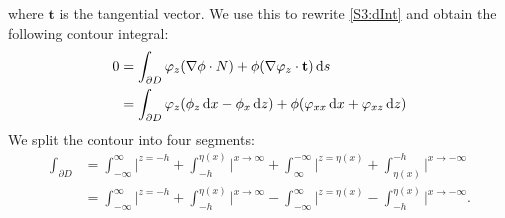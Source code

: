 \documentclass[11pt,reqno,oneside,a4paper]{article}
\begin{document}
where $\textbf{t}$ is the tangential vector. We use this to rewrite \eqref{S3:dInt} and obtain the following contour integral:
\begin{equation}
\begin{aligned}
0 &= \int_{\partial D} \varphi_z(\nabla  \phi \cdot N) + \phi(\nabla  \varphi_z \cdot \textbf{t}) \,\mathrm{d} s \nonumber \\
&= \int_{\partial D} \varphi_z (\phi_z \,\mathrm{d} x - \phi_x \,\mathrm{d} z) + \phi(\varphi_{xx} \,\mathrm{d} x + \varphi_{xz} \,\mathrm{d} z) \label{S3:DimContInt}
\end{aligned}
\end{equation}
We split the contour into four segments:
\begin{align*}
\int_{\partial D} &= \int^{\infty}_{-\infty} \bigg|^{z = -h} + \int_{-h}^{\eta(x)} \bigg|^{x \to \infty}+ \int_{\infty}^{-\infty}\bigg|^{z=\eta(x)} + \int_{\eta(x)}^{-h}\bigg|^{x \to -\infty} \\
&=  \int^{\infty}_{-\infty} \bigg|^{z = -h} +  \int_{-h}^{\eta(x)} \bigg|^{x \to \infty} - \int_{-\infty}^{\infty}\bigg|^{z=\eta(x)} -  \int^{\eta(x)}_{-h} \bigg|^{x \to -\infty}.
\end{align*}
\end{document}
